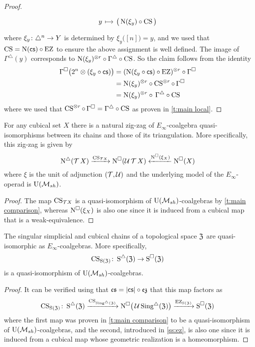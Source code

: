 \begin{proof}
\[\begin{tikzcd}[column sep=small, row sep=0]
		y \arrow[r,mapsto]& \big( \chains(\xi_y) \circ \CS \big)
	\end{tikzcd}
	\]
	where $\xi_y \colon \triangle^n \to Y$ is determined by $\xi_y \big( [n] \big) = y$, and we used that $\operatorname{CS} = \operatorname{N}(\operatorname{\mathsf{cs}}) \circ \operatorname{EZ}$ to ensure the above assignment is well defined.
	The image of $\Gamma^\triangle(y)$ corresponds to $\operatorname{N}(\xi_y)^{\otimes r} \circ \Gamma^\triangle \circ \operatorname{CS}$.
	So the claim follows from the identity
	\begin{align*}
		\Gamma^\square \big( 2^n \otimes (\xi_y \circ \operatorname{\mathsf{cs}}) \big) &=
		(\operatorname{N}(\xi_y \circ \operatorname{\mathsf{cs}}) \circ \operatorname{EZ})^{\otimes r} \circ \Gamma^\square \\ &=
		\operatorname{N}(\xi_y)^{\otimes r} \circ \operatorname{CS}^{\otimes r} \circ \, \Gamma^\square \\ &=
		\operatorname{N}(\xi_y)^{\otimes r} \circ \, \Gamma^\triangle \circ \operatorname{CS}
	\end{align*}
	where we used that $\operatorname{CS}^{\otimes r} \circ \, \Gamma^\square = \Gamma^\triangle \circ \operatorname{CS}$ as proven in \cref{t:main local}.
\end{proof}

\begin{corollary} \label{c:zig-zag}
	For any cubical set $X$ there is a natural zig-zag of $E_\infty$-coalgebra quasi-isomorphisms between its chains and those of its triangulation.
	More specifically, this zig-zag is given by
	\[
	\operatorname{N^{\triangle}}(\operatorname{\mathcal{T}} X) \xrightarrow{\operatorname{CS}_{\mathcal{T} X}}
	\operatorname{N^{\square}}(\operatorname{\mathcal{U}}{\operatorname{\mathcal{T}} X}) \xleftarrow{\operatorname{N^{\square}}(\xi_X)}
	\operatorname{N^{\square}}(X)
	\]
	where $\xi$ is the unit of adjunction $(\operatorname{\mathcal{T}}, \operatorname{\mathcal{U}})$ and the underlying model of the $E_\infty$-operad is ${\operatorname{U}(\mathcal{M}_{sh})}$.
\end{corollary}

\begin{proof}
	The map $\operatorname{CS}_{\mathcal{T} X}$ is a quasi-isomorphism of ${\operatorname{U}(\mathcal{M}_{sh})}$-coalgebras by \cref{t:main comparison}, whereas $\operatorname{N^{\square}}(\xi_X)$ is also one since it is induced from a cubical map that is a weak-equivalence.
\end{proof}

\begin{corollary} \label{c:cs e infty}
	The singular simplicial and cubical chains of a topological space $\mathfrak{Z}$ are quasi-isomorphic as $E_\infty$-coalgebras.
	More specifically,
	\[
	\operatorname{CS}_{\operatorname{S}(\mathfrak{Z})} \colon \operatorname{\operatorname{S}^{\triangle}}(\mathfrak{Z}) \to \operatorname{\operatorname{S}^{\square}}(\mathfrak{Z})
	\]
	is a quasi-isomorphism of ${\operatorname{U}(\mathcal{M}_{sh})}$-coalgebras.
\end{corollary}

\begin{proof}
	It can be verified using that $\operatorname{\mathfrak{cs}} = \lvert\operatorname{\mathsf{cs}}\rvert \circ \operatorname{\mathfrak{ez}}$ that this map factors as
	\[
	\operatorname{CS}_{\operatorname{S}(\mathfrak{Z})} \colon \operatorname{\operatorname{S}^{\triangle}}(\mathfrak{Z}) \xrightarrow{\operatorname{CS}_{\operatorname{Sing^{\triangle}}(\mathfrak{Z})}} \operatorname{N^{\square}}\!\big(\operatorname{\mathcal{U}}\operatorname{Sing^{\triangle}}(\mathfrak{Z})\big) \xrightarrow{\operatorname{EZ}_{\operatorname{S}(\mathfrak{Z})}} \operatorname{\operatorname{S}^{\square}}(\mathfrak{Z})
	\]
	where the first map was proven in \cref{t:main comparison} to be a quasi-isomorphism of ${\operatorname{U}(\mathcal{M}_{sh})}$-coalgebras, and the second, introduced in \cref{ss:ez}, is also one since it is induced from a cubical map whose geometric realization is a homeomorphism.
\end{proof}

